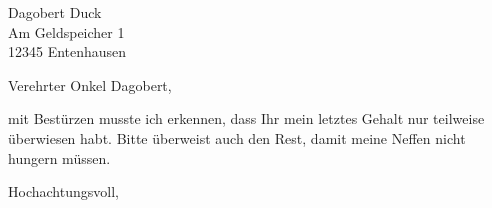 \documentclass[ngerman,12pt]{scrlttr2}
\begin{document}
\begin{letter}{Dagobert Duck \\ Am Geldspeicher 1 \\ 12345 Entenhausen}

\opening{Verehrter Onkel Dagobert,}

mit Bestürzen musste ich erkennen, dass Ihr mein letztes Gehalt nur teilweise überwiesen habt. Bitte überweist auch den Rest, damit meine Neffen nicht hungern müssen.

\blindtext[5]

\closing{Hochachtungsvoll,}


\end{letter}
\end{document}
